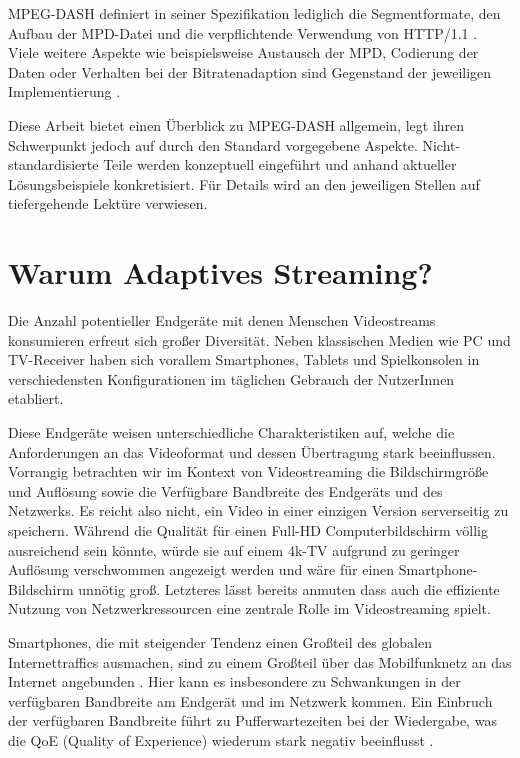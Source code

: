\documentclass[paper = a4, fontsize = 12pt, parskip = half]{scrartcl} %
\begin{document}
MPEG-DASH definiert in seiner Spezifikation lediglich die Segmentformate, den Aufbau der MPD-Datei und die verpflichtende Verwendung von HTTP/1.1 \cite{mpeg_dynamic_2013}. Viele weitere Aspekte wie beispielsweise Austausch der MPD, Codierung der Daten oder Verhalten bei der Bitratenadaption sind Gegenstand der jeweiligen Implementierung \cite{sodagar_mpeg-dash_2011}.

Diese Arbeit bietet einen Überblick zu MPEG-DASH allgemein, legt ihren Schwerpunkt jedoch auf durch den Standard vorgegebene Aspekte.
Nicht-standardisierte Teile werden konzeptuell eingeführt und anhand aktueller Lösungsbeispiele konkretisiert. Für Details wird an den jeweiligen Stellen auf tiefergehende Lektüre verwiesen.

\section{Warum Adaptives Streaming?}
Die Anzahl potentieller Endgeräte mit denen Menschen Videostreams konsumieren erfreut sich großer Diversität. Neben klassischen Medien wie PC und TV-Receiver haben sich vorallem Smartphones, Tablets und Spielkonsolen in verschiedensten Konfigurationen im täglichen Gebrauch der NutzerInnen etabliert.

Diese Endgeräte weisen unterschiedliche Charakteristiken auf, welche die Anforderungen an das Videoformat und dessen Übertragung stark beeinflussen. Vorrangig betrachten wir im Kontext von Videostreaming die Bildschirmgröße und Auflösung sowie die Verfügbare Bandbreite des Endgeräts und des Netzwerks.
Es reicht also nicht, ein Video in einer einzigen Version serverseitig zu speichern. Während die Qualität für einen Full-HD Computerbildschirm völlig ausreichend sein könnte, würde sie auf einem 4k-TV aufgrund zu geringer Auflösung verschwommen angezeigt werden und wäre für einen Smartphone-Bildschirm unnötig groß. Letzteres lässt bereits anmuten dass auch die effiziente Nutzung von Netzwerkressourcen eine zentrale Rolle im Videostreaming spielt.

Smartphones, die mit steigender Tendenz einen Großteil des globalen Internettraffics ausmachen, sind zu einem Großteil über das Mobilfunknetz an das Internet angebunden \cite{cisco_syst_inc_cisco_2017}. Hier kann es insbesondere zu Schwankungen in der verfügbaren Bandbreite am Endgerät und im Netzwerk kommen. Ein Einbruch der verfügbaren Bandbreite führt zu Pufferwartezeiten bei der Wiedergabe, was die QoE (Quality of Experience) wiederum stark negativ beeinflusst \cite{seufert_survey_2015}.
\end{document}
